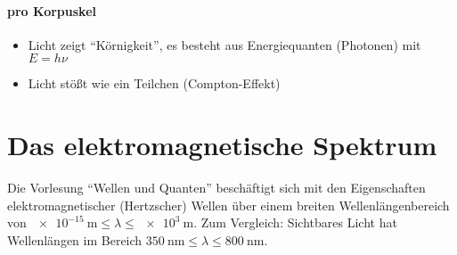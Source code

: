 \paragraph*{pro Korpuskel}
\begin{itemize}
\item Licht zeigt \enquote{Körnigkeit},
  es besteht aus Energiequanten (Photonen) mit $E=h\nu$
\item Licht stößt wie ein Teilchen (Compton-Effekt)
\end{itemize}

\section{Das elektromagnetische Spektrum}
Die Vorlesung \enquote{Wellen und Quanten} beschäftigt sich mit den
Eigenschaften elektromagnetischer (Hertzscher) Wellen über einem breiten
Wellenlängenbereich von
$\SI{e-15}{\m} \leq \lambda\leq \SI{e3}{\m}$.
Zum Vergleich: Sichtbares Licht hat Wellenlängen im Bereich
$\SI{350}{\nano\m} \leq \lambda \leq \SI{800}{\nano\m}$.


